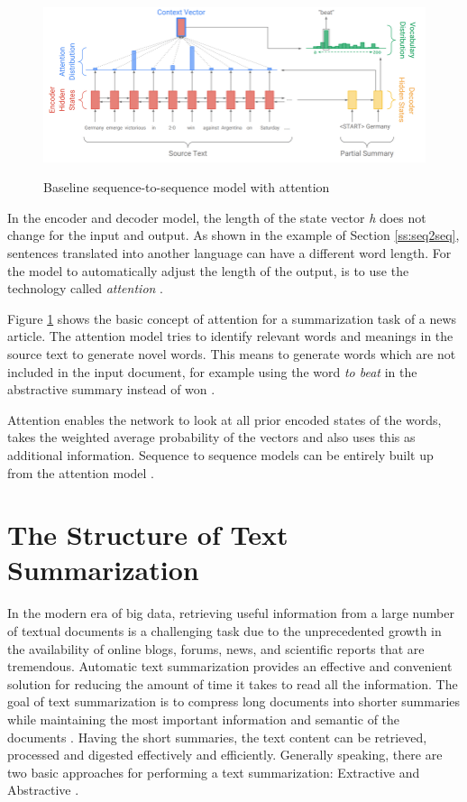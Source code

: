 \begin{figure}
	\begin{center}
		\includegraphics[width=6.5in]{photos/attenion}\\
		\caption{Baseline sequence-to-sequence model with attention \cite{see-etal-2017-get} }\label{attention1}
	\end{center}
\end{figure}

In the encoder and decoder model, the length of the state vector \textit{h} does not change for the input and output. As shown in the example of Section \ref{ss:seq2seq}, sentences translated into another language can have a different word length. For the model to automatically adjust the length of the output, is to use the technology called \textit{attention} \cite{attention} \cite{attention2}.

Figure \ref{attention1} shows the basic concept of attention for a summarization task of a news article.  The attention model tries to identify relevant words and meanings in the source text to generate novel words. This means to generate words which are not included in the input document, for example using the word \textit{to beat} in the abstractive summary instead of won \cite{see-etal-2017-get}.

Attention enables the network to look at all prior encoded states of the words, takes the weighted average probability of the vectors and also uses this as additional information. Sequence to sequence models can be entirely built up from the attention model \cite{attention2}. 

\section{The Structure of Text Summarization}

In the modern era of big data, retrieving useful information from a large number of textual documents is a challenging task due to the unprecedented growth in the availability of online blogs, forums, news, and scientific reports that are tremendous. Automatic text summarization provides an effective and convenient solution for reducing the amount of time it takes to read all the information. The goal of text summarization is to compress long documents into shorter summaries while maintaining the most important information and semantic of the documents \cite{ts-intro} \cite{ts-intro2}. Having the short summaries, the text content can be retrieved, processed and digested effectively and efficiently. 
Generally speaking, there are two basic approaches for performing a text summarization: Extractive and Abstractive \cite{ts-intro3}. 

